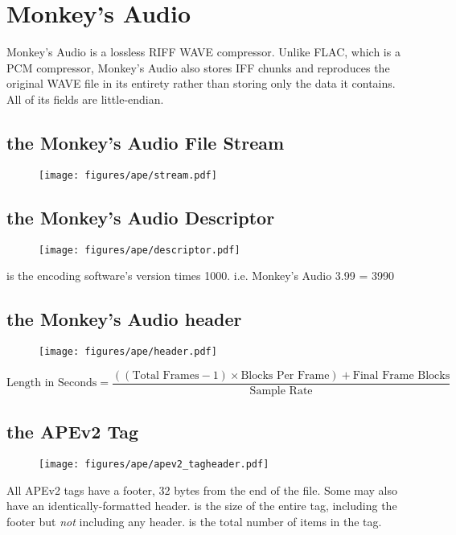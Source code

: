 
\chapter{Monkey's Audio}
Monkey's Audio is a lossless RIFF WAVE compressor.
Unlike FLAC, which is a PCM compressor, Monkey's Audio also stores
IFF chunks and reproduces the original WAVE file in its entirety rather
than storing only the data it contains.
All of its fields are little-endian.

\section{the Monkey's Audio File Stream}
\begin{figure}[h]
\texttt{[image: figures/ape/stream.pdf]}
\end{figure}

\section{the Monkey's Audio Descriptor}
\begin{figure}[h]
\texttt{[image: figures/ape/descriptor.pdf]}
\end{figure}
\par
\noindent
{} is the encoding software's version times 1000.
i.e. Monkey's Audio 3.99 = 3990

\section{the Monkey's Audio header}
\begin{figure}[h]
\texttt{[image: figures/ape/header.pdf]}
\end{figure}
{
\begin{equation}
\text{Length in Seconds} = \frac{((\text{Total Frames} - 1) \times \text{Blocks Per Frame}) + \text{Final Frame Blocks}}{\text{Sample Rate}}
\end{equation}
}
\section{the APEv2 Tag}
\label{apev2}
\begin{figure}[h]
  \texttt{[image: figures/ape/apev2\_tagheader.pdf]}
\end{figure}
All APEv2 tags have a footer, 32 bytes from the end of the file.
Some may also have an identically-formatted header.
 is the size of the entire tag,
including the footer but \textit{not} including any header.
 is the total number of items in the tag.

